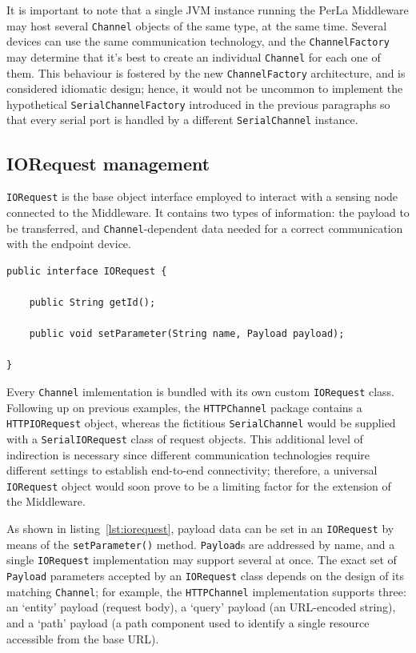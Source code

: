 It is important to note that a single JVM instance running the PerLa Middleware
may host several \texttt{Channel} objects of the same type, at the same time.
Several devices can use the same communication technology, and the
\texttt{ChannelFactory} may determine that it's best to create an individual
\texttt{Channel} for each one of them. This behaviour is fostered by the new
\texttt{ChannelFactory} architecture, and is considered idiomatic design;
hence, it would not be uncommon to implement the hypothetical
\texttt{SerialChannelFactory} introduced in the previous paragraphs so that
every serial port is handled by a different \texttt{SerialChannel} instance.


\subsection{IORequest management}

\texttt{IORequest} is the base object interface employed to interact with a
sensing node connected to the Middleware. It contains two types of information:
the payload to be transferred, and \texttt{Channel}-dependent data needed for a
correct communication with the endpoint device.

\lstset{language=Java}
\begin{lstlisting}[float,floatplacement=!hbt,caption=The IORequest
interface,label={lst:iorequest}]
public interface IORequest {

	public String getId();

	public void setParameter(String name, Payload payload);
	
}
\end{lstlisting}

Every \texttt{Channel} imlementation is bundled with its own custom
\texttt{IORequest} class. Following up on previous examples, the
\texttt{HTTPChannel} package contains a \texttt{HTTPIORequest} object, whereas
the fictitious \texttt{SerialChannel} would be supplied with a
\texttt{SerialIORequest} class of request objects. This additional level of
indirection is necessary since different communication technologies require
different settings to establish end-to-end connectivity; therefore, a universal
\texttt{IORequest} object would soon prove to be a limiting factor for the
extension of the Middleware.

As shown in listing~\ref{lst:iorequest}, payload data can be set in an
\texttt{IORequest} by means of the \texttt{setParameter()} method.
\texttt{Payload}s are addressed by name, and a single \texttt{IORequest}
implementation may support several at once. The exact set of \texttt{Payload}
parameters accepted by an \texttt{IORequest} class depends on the design of its
matching \texttt{Channel}; for example, the \texttt{HTTPChannel}
implementation supports three: an `entity' payload (request body), a `query'
payload (an URL-encoded string), and a `path' payload (a path component used to
identify a single resource accessible from the base URL).

